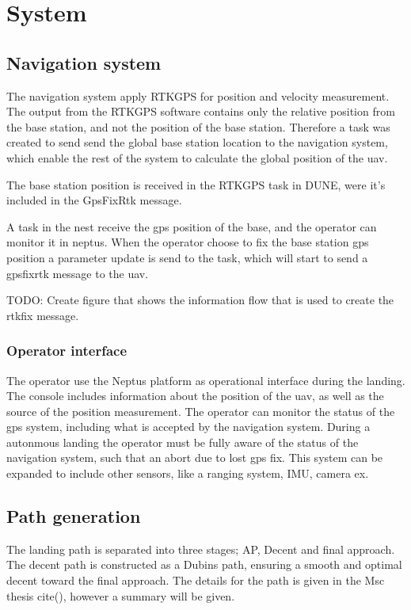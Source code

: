 \chapter{System}

\section{Navigation system}
The navigation system apply RTKGPS for position and velocity measurement. The output from the RTKGPS software contains only the relative position from the base station, and not the position of the base station. Therefore a task was created to send send the global base station location to the navigation system, which enable the rest of the system to calculate the global position of the uav. 

The base station position is received in the RTKGPS task in DUNE, were it's included in the GpsFixRtk message.

A task in the nest receive the gps position of the base, and the operator can monitor it in neptus. When the operator choose to fix the base station gps position a parameter update is send to the task, which will start to send a gpsfixrtk message to the uav. 

TODO: Create figure that shows the information flow that is used to create the rtkfix message.
\subsection{Operator interface}
The operator use the Neptus platform as operational interface during the landing. The console includes information about the position of the uav, as well as the source of the position measurement. The operator can monitor the status of the gps system, including what is accepted by the navigation system. During a autonmous landing the operator must be fully aware of the status of the navigation system, such that an abort due to lost gps fix. This system can be expanded to include other sensors, like a ranging system, IMU, camera ex. 
\section{Path generation}
The landing path is separated into three stages; AP, Decent and final approach. The decent path is constructed as a Dubins path, ensuring a smooth and optimal decent toward the final approach. The details for the path is given in the Msc thesis cite(), however a summary will be given.

